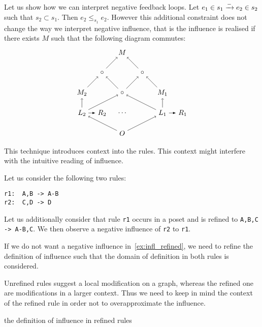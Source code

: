 \begin{example}

Let us show how we can interpret negative feedback loops. Let $e_1\in s_1\mathrel{\xrightarrow{-}} e_2\in s_2$ such that $s_2\subset s_1$. Then $e_2\leq_{s_1} e_2$. However this additional constraint does not change the way we interpret negative influence, that is the influence is realised if there exists $M$ such that the following diagram commutes:
\[
\begin{tikzpicture} %
\node (o) at (0,-1) {\(O\)};
\node (p) at (0,1) {\(\circ\)};
\node (n) at (0,3) {\(M\)};
\node (r1) at (-1,0) {\(R_2\)};
\node (l1) at (-2,0) {\(L_2\)};
\node (l2) at (2,0) {\(L_1\)};
\node (r2) at (3,0) {\(R_1\)};
\node (n1) at (-2,1) {\(M_2\)};
\node (n2) at (2,1) {\(M_1\)};
\node (p1) at (-1,2) {\(\circ\)};
\node (p2) at (1,2) {\(\circ\)};
\node (dots) at (0,0) {\(\cdots\)};
\draw [->] (l1) -- (n1);
\draw [->] (l2) -- (n2);
\draw [->] (o) -- (l1);
\draw [->] (o) -- (l2);
\draw [->] (l1) -- (p);
\draw [->] (l2) -- (p);
\draw [->] (p) -- (p1);
\draw [->] (p) -- (p2);
\draw [->] (n1) -- (p1);
\draw [->] (n2) -- (p2);
\draw [->] (p1) -- (n);
\draw [->] (p2) -- (n);
\draw [>=latex, ->] (l1) -- (r1);
\draw [>=latex, ->] (l2) -- (r2);
\end{tikzpicture}
\]
\end{example}

This technique introduces context into the rules. This context might interfere with the intuitive reading of influence.

\begin{example}
\label{ex:infl_refined}
Let us consider the following two rules:

\begin{verbatim}
r1:  A,B -> A-B
r2:  C,D -> D
\end{verbatim}

Let us additionally consider that rule \verb|r1| occurs in a poset and is refined to \verb|A,B,C -> A-B,C|. We then observe a negative influence of \verb|r2| to \verb|r1|.
\end{example}

If we do not want a negative influence in~\autoref{ex:infl_refined}, we need to refine the definition of influence such that the domain of definition in both rules is considered.

Unrefined rules suggest a local modification on a graph, whereas the refined one are modifications in a larger context. Thus we need to keep in mind the context of the refined rule in order not to overapproximate the influence.

\begin{mdframed}[backgroundcolor=blue!20]
  the definition of influence in refined rules
\end{mdframed}

